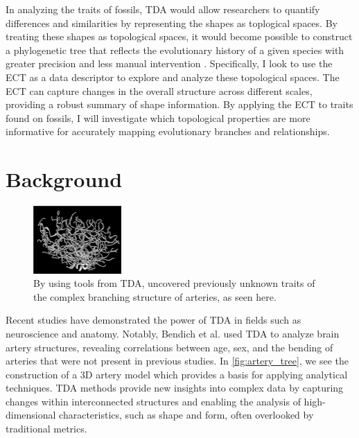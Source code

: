 \documentclass[12pt]{article}
\begin{document}
In analyzing the traits of fossils, TDA would allow researchers to quantify
differences and similarities by representing the shapes as toplogical spaces. By 
treating these shapes as topological spaces, it would become possible to construct a 
phylogenetic tree that reflects the evolutionary history of a given species 
with greater precision and less manual intervention \citep{yang2012}.
Specifically, I look to use the ECT as a data descriptor to explore and analyze
these topological spaces. The ECT can capture changes in the overall structure
across different scales, providing a robust summary of shape information. By
applying the ECT to traits found on fossils, I will investigate which
topological properties are more informative for accurately mapping evolutionary
branches and relationships. 


\section{Background}
\begin{figure}
	\centering
	\vspace{-12pt}
	\includegraphics[width=0.3\textwidth]{arteryTree.png}
	\caption{By using tools from TDA, \cite{bendich2016} uncovered previously
unknown traits of the complex branching structure of arteries, as seen here.}
	\label{fig:artery_tree}
\end{figure}
\vspace{-12pt}

Recent studies have demonstrated the power of TDA in fields such as neuroscience
and anatomy. Notably, Bendich et al. \cite{bendich2016} used
TDA to analyze brain artery structures, revealing correlations between age, sex, 
and the bending of arteries that were not present in previous studies. In
\autoref{fig:artery_tree}, we see the construction of a 3D artery model which
provides a basis for applying analytical techniques. TDA methods provide new 
insights into complex data by capturing changes within interconnected 
structures and enabling the analysis of high-dimensional characteristics, 
such as shape and form, often overlooked by traditional metrics. 
\end{document}
